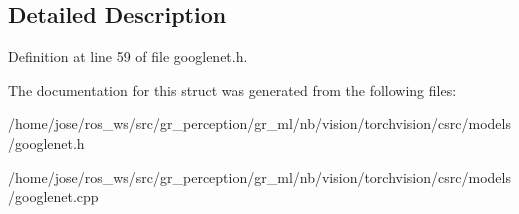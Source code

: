 \subsection{Detailed Description}


Definition at line 59 of file googlenet.\+h.



The documentation for this struct was generated from the following files\+:\begin{DoxyCompactItemize}
\item 
/home/jose/ros\+\_\+ws/src/gr\+\_\+perception/gr\+\_\+ml/nb/vision/torchvision/csrc/models/googlenet.\+h\item 
/home/jose/ros\+\_\+ws/src/gr\+\_\+perception/gr\+\_\+ml/nb/vision/torchvision/csrc/models/googlenet.\+cpp\end{DoxyCompactItemize}
